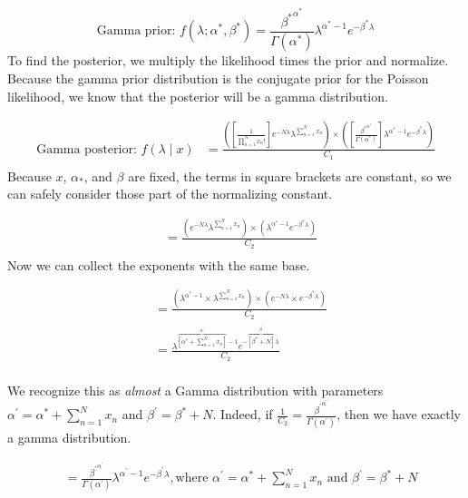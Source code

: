 \documentclass[
]{book}
\begin{document}
\[
\text{Gamma prior: } f( \lambda; \alpha^*, \beta^*) = \frac{{\beta^*}^{\alpha^*}}{\Gamma(\alpha^*)} \lambda^{\alpha^* - 1} e^{-\beta^*\lambda}
\] To find the posterior, we multiply the likelihood times the prior and
normalize. Because the gamma prior distribution is the conjugate prior
for the Poisson likelihood, we know that the posterior will be a gamma
distribution.

\[
\begin{aligned}
\text{Gamma posterior: } f( \lambda  \mid x) &= \frac{\left( \displaystyle \left[ \frac{1}{\prod_{n = 1}^N x_n !} \right]e^{-N\lambda}\lambda^{\sum_{n = 1}^N x_n}\right) \times \left( \left[ \frac{{\beta^*}^{\alpha^*}}{\Gamma(\alpha^*)} \right] \lambda^{\alpha^* - 1} e^{-\beta^*\lambda}\right)}{C_1} \\
\end{aligned}
\] Because \(x\), \(\alpha_*\), and \(\beta\) are fixed, the terms in
square brackets are constant, so we can safely consider those part of
the normalizing constant.

\[
\begin{aligned}
&= \frac{\left( \displaystyle  e^{-N\lambda}\lambda^{\sum_{n = 1}^N x_n}\right) \times \left( \lambda^{\alpha^* - 1} e^{-\beta^*\lambda}\right)}{C_2} \\
\end{aligned}
\] Now we can collect the exponents with the same base.

\[
\begin{aligned}
&= \frac{\left( \lambda^{\alpha^* - 1} \times \lambda^{\sum_{n = 1}^N x_n}\right) \times \left( \displaystyle  e^{-N\lambda} \times e^{-\beta^*\lambda} \right)}{C_2} \\
&= \frac{\lambda^{ \overbrace{\left[ \alpha^* + \sum_{n = 1}^N x_n \right]}^{\alpha^\prime} - 1}  e^{-\overbrace{[\beta^* + N]}^{\beta^\prime}\lambda} }{C_2} \\
\end{aligned}
\]

We recognize this as \emph{almost} a Gamma distribution with parameters
\(\alpha^\prime = \alpha^* + \sum_{n = 1}^N x_n\) and
\(\beta^\prime = \beta^* + N\). Indeed, if
\(\frac{1}{C_2} = \frac{{\beta^\prime}^{\alpha^\prime}}{\Gamma(\alpha^{\prime})}\),
then we have exactly a gamma distribution.

\[
\begin{aligned}
&= \frac{{\beta^\prime}^{\alpha^\prime}}{\Gamma(\alpha^{\prime})} \lambda^{ \alpha^\prime - 1}  e^{-\beta^\prime\lambda}, \text{where } \alpha^\prime = \alpha^* +  \sum_{n = 1}^N x_n \text{ and } \beta^\prime = \beta^* + N
\end{aligned}
\]
\end{document}
